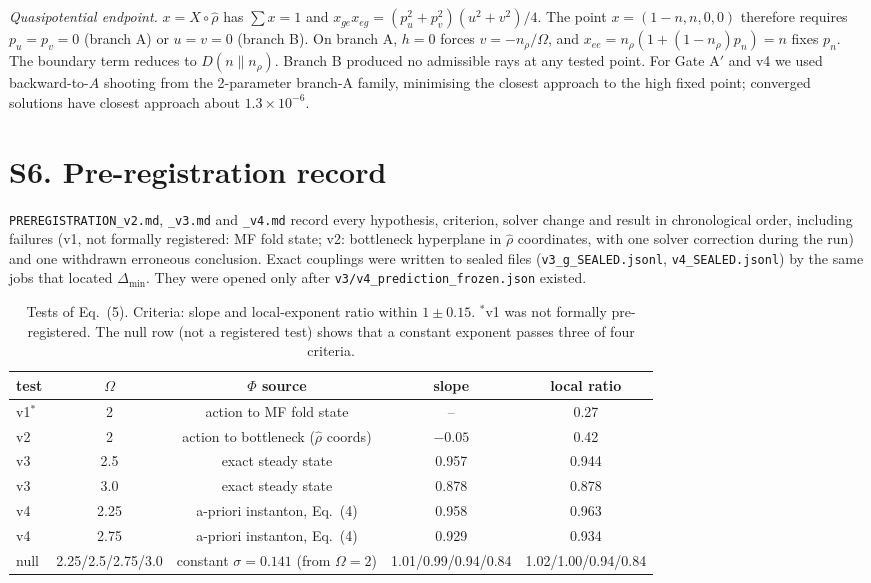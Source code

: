 \documentclass[aps,prl,onecolumn,superscriptaddress,amsmath,amssymb]{revtex4-2}
\begin{document}
\emph{Quasipotential endpoint.} $x=\hat X\!\circ\!\hat\rho$ has $\sum x=1$ and $x_{ge}x_{eg}=(p_u^2+p_v^2)(u^2+v^2)/4$. The point $x=(1-n,n,0,0)$ therefore requires $p_u=p_v=0$ (branch A) or $u=v=0$ (branch B). On branch A, $h=0$ forces $v=-n_\rho/\Omega$, and $x_{ee}=n_\rho(1+(1-n_\rho)p_n)=n$ fixes $p_n$. The boundary term reduces to $D(n\|n_\rho)$. Branch B produced no admissible rays at any tested point. For Gate A$'$ and v4 we used backward-to-$A$ shooting from the 2-parameter branch-A family, minimising the closest approach to the high fixed point; converged solutions have closest approach about $1.3\times10^{-6}$.

\section{S6. Pre-registration record}
\texttt{PREREGISTRATION\_v2.md}, \texttt{\_v3.md} and \texttt{\_v4.md} record every hypothesis, criterion, solver change and result in chronological order, including failures (v1, not formally registered: MF fold state; v2: bottleneck hyperplane in $\hat\rho$ coordinates, with one solver correction during the run) and one withdrawn erroneous conclusion. Exact couplings were written to sealed files (\texttt{v3\_g\_SEALED.jsonl}, \texttt{v4\_SEALED.jsonl}) by the same jobs that located $\Delta_{\min}$. They were opened only after \texttt{v3/v4\_prediction\_frozen.json} existed.

\begin{table}[h]
\caption{Tests of Eq.~(5). Criteria: slope and local-exponent ratio within $1\pm0.15$. $^*$v1 was not formally pre-registered. The null row (not a registered test) shows that a constant exponent passes three of four criteria.}
\begin{tabular}{lcccc}
\hline\hline
test & $\Omega$ & $\Phi$ source & slope & local ratio\\\hline
v1$^*$ & 2 & action to MF fold state & -- & 0.27\\
v2 & 2 & action to bottleneck ($\hat\rho$ coords) & $-0.05$ & 0.42\\
v3 & 2.5 & exact steady state & 0.957 & 0.944\\
v3 & 3.0 & exact steady state & 0.878 & 0.878\\
v4 & 2.25 & a-priori instanton, Eq.~(4) & 0.958 & 0.963\\
v4 & 2.75 & a-priori instanton, Eq.~(4) & 0.929 & 0.934\\\hline
null & 2.25/2.5/2.75/3.0 & constant $\sigma=0.141$ (from $\Omega=2$) & 1.01/0.99/0.94/0.84 & 1.02/1.00/0.94/0.84\\\hline\hline
\end{tabular}
\end{table}
\end{document}
